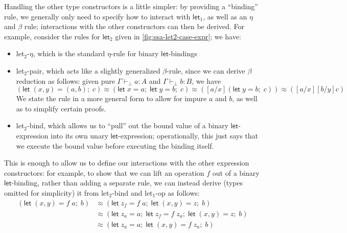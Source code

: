 \documentclass[acmsmall,screen,review]{acmart}
\newcommand{\ms}[1]{\ensuremath{\mathsf{#1}}}
\newcommand{\letexpr}[3]{\ensuremath{\ms{let}\;#1 = #2;\;#3}}
\newcommand{\hasty}[4]{#1 \vdash_{#2} #3: {#4}}
\newcommand{\teqv}{\approx}
\newcommand{\brle}[1]{{\scriptsize\textsf{#1}}}
\begin{document}
Handling the other type constructors is a little simpler: by providing a ``binding'' rule, we
generally only need to specify how to interact with $\ms{let}_1$, as well as an $\eta$ and $\beta$
rule; interactions with the other constructors can then be derived. For example, consider the rules
for $\ms{let}_2$ given in \ref{fig:ssa-let2-case-expr}; we have:
\begin{itemize}
  \item \brle{let$_2$-$\eta$}, which is the standard $\eta$-rule for binary \ms{let}-bindings
  \item \brle{let$_2$-pair}, which acts like a slightly generalized $\beta$-rule, since we can
  derive $\beta$ reduction as follows: given pure $\hasty{\Gamma}{\bot}{a}{A}$ and
  $\hasty{\Gamma}{\bot}{b}{B}$, we have
  $$
  (\letexpr{(x, y)}{(a, b)}{c}) 
  \teqv (\letexpr{x}{a}{\letexpr{y}{b}{c}})
  \teqv ([a/x](\letexpr{y}{b}{c}))
  \teqv ([a/x][b/y]c)
  $$
  We state the rule in a more general form to allow for impure $a$ and $b$, as well as to simplify
  certain proofs.
  \item \brle{let$_2$-bind}, which allows us to ``pull'' out the bound value of a binary
  \ms{let}-expression into its own unary \ms{let}-expression; operationally, this just says that
  we execute the bound value before executing the binding itself.
\end{itemize}
This is enough to allow us to define our interactions with the other expression constructors: for
example, to show that we can lift an operation $f$ out of a binary $\ms{let}$-binding, rather than
adding a separate rule, we can instead derive (types omitted for simplicity) it from
\brle{let$_2$-bind} and \brle{let$_1$-op} as follows:
\begin{align*}
  (\letexpr{(x, y)}{f\;a}{b})
  &\teqv (\letexpr{z_f}{f\;a}{\letexpr{(x, y)}{z}{b}}) \\
  &\teqv (\letexpr{z_a}{a}{\letexpr{z_f}{f\;z_a}{\letexpr{(x, y)}{z}{b}}}) \\
  &\teqv (\letexpr{z_a}{a}{\letexpr{(x, y)}{f\;z_a}{b}})
\end{align*}
\end{document}
